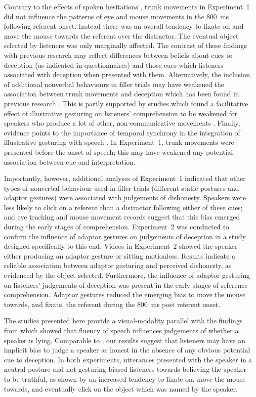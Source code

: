 \documentclass[a4paper,man,natbib]{apa6}
\let\oldtodo\todo
\renewcommand*{\todo}[1]{\oldtodo[fancyline]{#1}}
\begin{document}
Contrary to the effects of spoken hesitations \citep[e.g.][]{Loy2017}, trunk movements in Experiment~1 did not influence the patterns of eye  and mouse movements in the 800~ms following referent onset.
Instead there was an overall tendency to fixate on and move the mouse towards the referent over the distractor.
The eventual object selected by listeners was only marginally affected.
The contrast of these findings with previous research \citep[e.g.][]{Vrij1996a} may reflect differences between beliefs about cues to deception (as indicated in questionnaires) and those cues which listeners associated with deception when presented with them.
Alternatively, the inclusion of additional nonverbal behaviours in filler trials may have weakened the association between trunk movements and deception which has been found in previous research \citep[e.g][]{Vrij1996a, Zuckerman1981}.
This is partly supported by studies which found a facilitative effect of illustrative gesturing on listeners' comprehension to be weakened for speakers who produce a lot of other, non-communicative movements \citep{Holle2007}. 
Finally, evidence points to the importance of temporal synchrony in the integration of illustrative gesturing with speech \citep[See][]{Habets2011}.
In Experiment~1, trunk movements were presented before the onset of speech; this may have weakened any potential association between cue and interpretation.

Importantly, however, additional analyses of Experiment~1 indicated that other types of nonverbal behaviour used in filler trials (different static postures and adaptor gestures) were associated with judgements of dishonesty.
Speakers were less likely to click on a referent than a distractor following either of these cues; and eye tracking and mouse movement records suggest that this bias emerged during the early stages of comprehension.
Experiment~2 was conducted to confirm the influence of adaptor gestures on judgements of deception in a study designed specifically to this end.
Videos in Experiment~2 showed the speaker either producing an adaptor gesture or sitting motionless.
Results indicate a reliable association between adaptor gesturing and perceived dishonesty, as evidenced by the object selected.
Furthermore, the influence of adaptor gesturing on listeners' judgements of deception was present in the early stages of reference comprehension.
Adaptor gestures reduced the emerging bias to move the mouse towards, and fixate, the referent during the 800~ms post referent onset.

The studies presented here provide a visual-modality parallel with the findings from \citet{Loy2017} which showed that fluency of speech influences judgements of whether a speaker is lying.
Comparable to \citet{Loy2017}, our results suggest that listeners may have an implicit bias to judge a speaker as honest in the absence of any obvious potential cue to deception.\todo{cite other ``honesty bias'' lit}
In both experiments, utterances presented with the speaker in a neutral posture and not gesturing biased listeners towards believing the speaker to be truthful, as shown by an increased tendency to fixate on, move the mouse towards, and eventually click on the object which was named by the speaker. 
\end{document}
